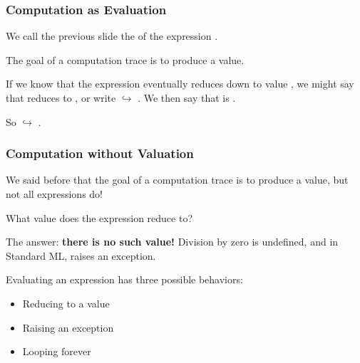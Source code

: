 \documentclass[aspectratio=169]{beamer}
\begin{document}
\begin{frame}[fragile]
  \frametitle{Computation as Evaluation}

  We call the previous slide the  of the expression . \\ 

  \vspace{5pt}

  The goal of a computation trace is to produce a value.

  \pause
  \vspace{\fill}

  If we know that the expression  eventually reduces down to value , we might
  say that  reduces to , or write  $\hookrightarrow$ . We then say
  that  is .

  \vspace{5pt}

  So  $\hookrightarrow$ .

\end{frame}

\begin{frame}[fragile]
  \frametitle{Computation without Valuation}

  We said before that the goal of a computation trace is to produce a value, but not 
  all expressions do!

  \pause
  \vspace{\fill}

  What value does the expression  reduce to?

  \pause
  \vspace{\fill}

  The answer: \textbf{there is no such value!} Division by zero is undefined, and in
  Standard ML, raises an exception.

  \pause
  \vspace{\fill}

  Evaluating an expression has three possible behaviors:
  \begin{itemize}
    \item Reducing to a value
    \item Raising an exception
    \item Looping forever
  \end{itemize}
\end{frame}
\end{document}
